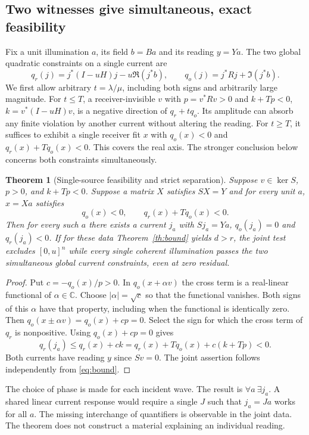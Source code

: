 \documentclass[anonymous,12pt]{iopjournal}
\newtheorem{theorem}{Theorem}[section]
\theoremstyle{remark}\newtheorem{remark}[theorem]{Remark}
\newcommand{\C}{\mathbb C}\newcommand{\R}{\mathbb R}
\numberwithin{equation}{section}
\begin{document}
\subsection{Two witnesses give simultaneous, exact feasibility}
Fix a unit illumination $a$, its field $b=Ba$ and its reading $y=Ya$. The two global quadratic constraints on a single current are
\begin{equation}
 q_r(j)=j^*(I-uH)j-u\Re(j^*b),\qquad
 q_o(j)=j^*Rj+\Im(j^*b).\label{eq:scalarforms}
\end{equation}
We first allow arbitrary $t=\lambda/\mu$, including both signs and arbitrarily large magnitude. For $t\le T$, a receiver-invisible $v$ with $p=v^*Rv>0$ and $k+Tp<0$, $k=v^*(I-uH)v$, is a negative direction of $q_r+tq_o$. Its amplitude can absorb any finite violation by another current without altering the reading. For $t\ge T$, it suffices to exhibit a single receiver fit $x$ with $q_o(x)<0$ and $q_r(x)+Tq_o(x)<0$. This covers the real axis. The stronger conclusion below concerns both constraints simultaneously.

\begin{theorem}[Single-source feasibility and strict separation]\label{th:two}
Suppose $v\in\ker S$, $p>0$, and $k+Tp<0$. Suppose a matrix $X$ satisfies $SX=Y$ and for every unit $a$, $x=Xa$ satisfies
\begin{equation}
 q_o(x)<0,\qquad q_r(x)+Tq_o(x)<0.\label{eq:meanwitness}
\end{equation}
Then for every such $a$ there exists a current $j_a$ with $Sj_a=Ya$, $q_o(j_a)=0$ and $q_r(j_a)<0$. If for these data Theorem~\ref{th:bound} yields $d>r$, the joint test excludes $[0,u]^n$ while every single coherent illumination passes the two simultaneous global current constraints, even at zero residual.
\end{theorem}
\begin{proof}
Put $c=-q_o(x)/p>0$. In $q_o(x+\alpha v)$ the cross term is a real-linear functional of $\alpha\in\C$. Choose $|\alpha|=\sqrt c$ so that the functional vanishes. Both signs of this $\alpha$ have that property, including when the functional is identically zero. Then $q_o(x\pm\alpha v)=q_o(x)+cp=0$. Select the sign for which the cross term of $q_r$ is nonpositive. Using $q_o(x)+cp=0$ gives
\[
 q_r(j_a)\le q_r(x)+ck=
       q_r(x)+Tq_o(x)+c(k+Tp)<0 .
\]
Both currents have reading $y$ since $Sv=0$. The joint assertion follows independently from \eqref{eq:bound}.
\end{proof}
The choice of phase is made for each incident wave. The result is $\forall a\ \exists j_a$. A shared linear current response would require a single $J$ such that $j_a=Ja$ works for all $a$. The missing interchange of quantifiers is observable in the joint data. The theorem does not construct a material explaining an individual reading.
\end{document}
